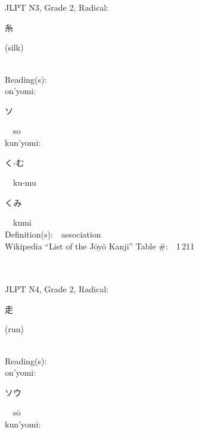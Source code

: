 \begin{multicols}{2}
\ \ \\
{\fontsize{34pt}{40pt}  }\ \ \\  %
{JLPT N3, Grade 2, Radical:\ \ {\begin{CJK}{UTF8}{min} 糸 \end{CJK}} (silk) } \\
Reading(s):\ \ \\
{\hspace*{1em}}on'yomi:\ \ \\
{\hspace*{2em}}{\begin{CJK}{UTF8}{min} ソ \end{CJK}}\ \ so\ \ \\
{\hspace*{1em}}kun'yomi:\ \ \\
{\hspace*{2em}}{\begin{CJK}{UTF8}{min} く-む \end{CJK}}\ \ ku-mu\ \ \\
{\hspace*{2em}}{\begin{CJK}{UTF8}{min} くみ \end{CJK}}\ \ kumi\ \ \\
Definition(s):\ \ association \\
Wikipedia ``List of the J\=oy\=o Kanji'' Table \#:\ \ 1\,211 \\
\ \ \\
{\fontsize{34pt}{40pt}  }\ \ \\  %
{JLPT N4, Grade 2, Radical:\ \ {\begin{CJK}{UTF8}{min} 走 \end{CJK}} (run) } \\
Reading(s):\ \ \\
{\hspace*{1em}}on'yomi:\ \ \\
{\hspace*{2em}}{\begin{CJK}{UTF8}{min} ソウ \end{CJK}}\ \ s\=o\ \ \\
{\hspace*{1em}}kun'yomi:\ \ \\

\end{multicols}
